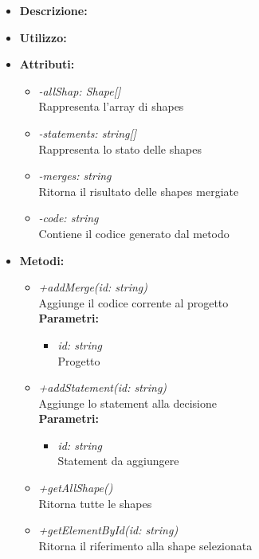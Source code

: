 \begin{itemize}
	\item \textbf{Descrizione:}\\
	
	\item \textbf{Utilizzo:}\\
	
	\item \textbf{Attributi:}
		\begin{itemize}
			\item \emph{-allShap: Shape[]}\\
			Rappresenta l'array di shapes
			\item \emph{-statements: string[]}\\
			Rappresenta lo stato delle shapes
			\item \emph{-merges: string}\\
			Ritorna il risultato delle shapes mergiate
			\item \emph{-code: string}\\
			Contiene il codice generato dal metodo
		\end{itemize}
	\item \textbf{Metodi:}
		\begin{itemize}
			\item \emph{+addMerge(id: string)}\\
    		Aggiunge il codice corrente al progetto\\
    		\textbf{Parametri:}
    		\begin{itemize}
    			\item \emph{id: string}\\
    			Progetto
    		\end{itemize}
    		\item \emph{+addStatement(id: string)}\\
    		Aggiunge lo statement alla decisione\\
    		\textbf{Parametri:}
    		\begin{itemize}
    			\item \emph{id: string}\\
    			Statement da aggiungere
    		\end{itemize}
    		\item \emph{+getAllShape()}\\
    		Ritorna tutte le shapes
    		\item \emph{+getElementById(id: string)}\\
    		Ritorna il riferimento alla shape selezionata\\

\end{itemize}
\end{itemize}

